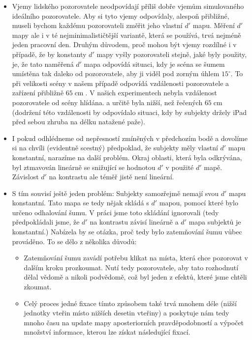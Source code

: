 \begin{itemize}
\item Vjemy lidského pozorovatele neodpovídají příliš dobře vjemům simulovaného
ideálního pozorovatele. Aby si tyto vjemy odpovídaly, alespoň přibližné, museli
bychom každému pozorovateli změřit jeho vlastní $d'$ mapu. Měření $d'$ mapy ale
i  v té nejminimalističtější variantě, která se používá, trvá nejméně jeden
pracovní den. Druhým důvodem, proč mohou být vjemy rozdílné i v případě, že by
konstanty $d'$ mapy vyšly pozorovateli stejně, jaké byly použity, je, že tato
naměřená $d'$ mapa odpovídá situaci, kdy je scéna se šumem umístěna tak daleko
od pozorovatele, aby ji viděl pod zorným úhlem $15^\circ$. To při velikosti
scény v našem případě odpovídá vzdálenosti pozorovatele a zařízení přibližně
$65 \operatorname{cm}$. V našich experimentech nebyla vzdálenost pozorovatele od
scény hlídána. a určitě byla nižší, než řečených $65 \operatorname{cm}$
(dodržení této vzdálenosti by odpovídalo situaci, kdy by subjekty držely iPad
před sebou zhruba na délku natažené paže). 

\item I pokud odhlédneme od nepřesností zmíněných v předchozím bodě a dovolíme
si na chvíli (evidentně scestný) předpoklad, že subjekty měly vlastní $d'$ mapu
konstantní, narazíme na další problém. Okraj oblasti, která byla odkrývána,
byl ztmavován lineárně se snižující se hodnotou $d'$ v použité $d'$ mapě.
Závislost $d'$ na kontrastu ale téměř jistě
není lineární.

\item S tím souvisí ještě jeden problém: Subjekty samozřejmě nemají svou $d'$
mapu konstantní. Tato mapa se tedy nějak skládá s $d'$ mapou, pomocí které
bylo určeno odhalování šumu. V práci jsme toto skládání ignorovali (tedy
předpokládali jsme, že $d'$ na kontrastu závisí lineárně a $d'$ mapa subjektů
je konstantní.) Nabízela by se otázka, proč tedy bylo zatemňování šumu vůbec
prováděno. To se dělo z několika důvodů:

\begin{itemize}

\item Zatemňování šumu zavádí potřebu klikat na místa, která chce pozorovat v
dalším kroku prozkoumat. Nutí tedy pozorovatele, aby tato rozhodnutí dělal
vědomě a nikoli podvědomě, což byl jeden z efektů, které jsme chtěli zkoumat.

\item Celý proces jedné fixace tímto způsobem také trvá mnohem déle (nižší
jednotky vteřin místo nižších desetin vteřiny) a poskytuje nám tedy mnoho času
na update mapy aposteriorních pravděpodobností a výpočet množství informace,
kterou lze získat následující fixací.


\end{itemize}
\end{itemize}
